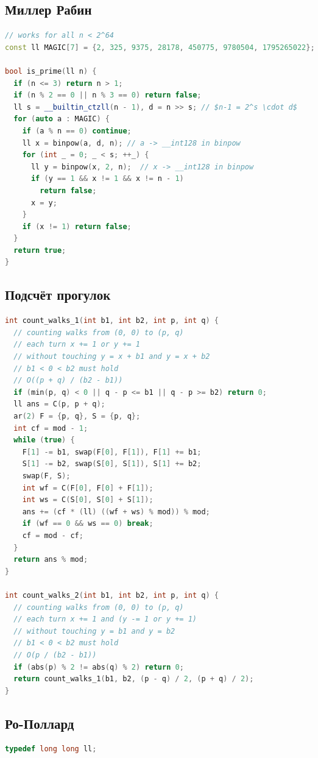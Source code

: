 \documentclass[8pt,a4paper,landscape,twosided]{extarticle}
\begin{document}
\begin{multicols*}{3}
\subsection{Миллер Рабин}
\begin{lstlisting}[language=C++]
// works for all n < 2^64
const ll MAGIC[7] = {2, 325, 9375, 28178, 450775, 9780504, 1795265022};

bool is_prime(ll n) {
  if (n <= 3) return n > 1;
  if (n % 2 == 0 || n % 3 == 0) return false;
  ll s = __builtin_ctzll(n - 1), d = n >> s; // $n-1 = 2^s \cdot d$
  for (auto a : MAGIC) {
    if (a % n == 0) continue;
    ll x = binpow(a, d, n); // a -> __int128 in binpow
    for (int _ = 0; _ < s; ++_) {
      ll y = binpow(x, 2, n);  // x -> __int128 in binpow
      if (y == 1 && x != 1 && x != n - 1)
        return false;
      x = y;
    }
    if (x != 1) return false;
  }
  return true;
}
\end{lstlisting}

\subsection{Подсчёт прогулок}
\begin{lstlisting}[language=C++]
int count_walks_1(int b1, int b2, int p, int q) {
  // counting walks from (0, 0) to (p, q)
  // each turn x += 1 or y += 1
  // without touching y = x + b1 and y = x + b2
  // b1 < 0 < b2 must hold
  // O((p + q) / (b2 - b1))
  if (min(p, q) < 0 || q - p <= b1 || q - p >= b2) return 0;
  ll ans = C(p, p + q);
  ar(2) F = {p, q}, S = {p, q};
  int cf = mod - 1;
  while (true) {
    F[1] -= b1, swap(F[0], F[1]), F[1] += b1;
    S[1] -= b2, swap(S[0], S[1]), S[1] += b2;
    swap(F, S);
    int wf = C(F[0], F[0] + F[1]);
    int ws = C(S[0], S[0] + S[1]);
    ans += (cf * (ll) ((wf + ws) % mod)) % mod;
    if (wf == 0 && ws == 0) break;
    cf = mod - cf;
  }
  return ans % mod;
}

int count_walks_2(int b1, int b2, int p, int q) {
  // counting walks from (0, 0) to (p, q)
  // each turn x += 1 and (y -= 1 or y += 1)
  // without touching y = b1 and y = b2
  // b1 < 0 < b2 must hold
  // O(p / (b2 - b1))
  if (abs(p) % 2 != abs(q) % 2) return 0;
  return count_walks_1(b1, b2, (p - q) / 2, (p + q) / 2);
}
\end{lstlisting}

\subsection{Ро-Поллард}
\begin{lstlisting}[language=C++]
typedef long long ll;


\end{lstlisting}
\end{multicols*}
\end{document}
